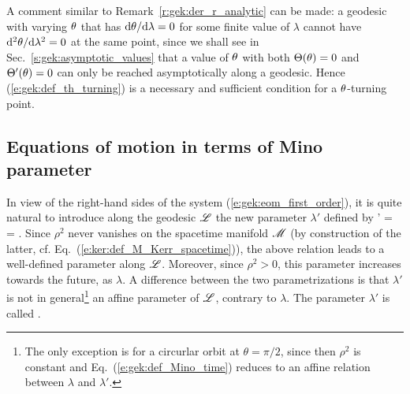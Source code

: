 \begin{remark}
A comment similar to Remark~\ref{r:gek:der_r_analytic} can be made:
a geodesic with varying $\theta$ that has $\mathrm{d}\theta/\mathrm{d}\lambda = 0$ for some finite
value of $\lambda$
cannot have $\mathrm{d}^2\theta/\mathrm{d}\lambda^2 = 0$ at the same point, since we shall see
in Sec.~\ref{s:gek:asymptotic_values}
that a value of $\theta$ with both $\Theta(\theta)=0$
and $\Theta'(\theta)=0$ can only be reached asymptotically along a geodesic.
Hence (\ref{e:gek:def_th_turning})
is a necessary and sufficient condition for a $\theta$-turning point.
\end{remark}


\subsection{Equations of motion in terms of Mino parameter} \label{s:gek:Mino_time}

In view of the right-hand sides of the system (\ref{e:gek:eom_first_order}),
it is quite natural to introduce along the geodesic $\mathscr{L}$ the new
parameter $\lambda'$ defined by
\be \label{e:gek:def_Mino_time}
    \D\lambda' = 
     =  .
\ee
Since $\rho^2$ never vanishes on the spacetime manifold $\mathscr{M}$ (by construction
of the latter, cf. Eq.~(\ref{e:ker:def_M_Kerr_spacetime})), the above relation
leads to a well-defined parameter along $\mathscr{L}$. Moreover, since $\rho^2>0$, this
parameter increases towards the future, as $\lambda$. A difference between
the two parametrizations is that $\lambda'$ is not in general\footnote{The only
exception is for a circurlar orbit at $\theta=\pi/2$, since then $\rho^2$
is constant and Eq.~(\ref{e:gek:def_Mino_time}) reduces to an affine relation
between $\lambda$ and $\lambda'$.} an affine parameter
of $\mathscr{L}$, contrary to $\lambda$.
The parameter $\lambda'$ is called  \cite{Mino03}.

